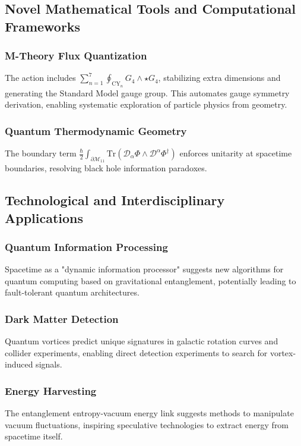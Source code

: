 \documentclass[12pt, a4paper]{article}
\begin{document}
\subsection{Novel Mathematical Tools and Computational Frameworks}
\subsubsection{M-Theory Flux Quantization}
The action includes \( \sum_{n=1}^7 \oint_{\text{CY}_n} G_4 \wedge \star G_4 \), stabilizing extra dimensions and generating the Standard Model gauge group. This automates gauge symmetry derivation, enabling systematic exploration of particle physics from geometry.

\subsubsection{Quantum Thermodynamic Geometry}
The boundary term \( \frac{\hbar}{2} \int_{\partial\mathcal{M}_{11}} \text{Tr}(\mathcal{D}_\alpha \Phi \wedge \mathcal{D}^\alpha \Phi^\dagger) \) enforces unitarity at spacetime boundaries, resolving black hole information paradoxes.

\subsection{Technological and Interdisciplinary Applications}
\subsubsection{Quantum Information Processing}
Spacetime as a "dynamic information processor" suggests new algorithms for quantum computing based on gravitational entanglement, potentially leading to fault-tolerant quantum architectures.

\subsubsection{Dark Matter Detection}
Quantum vortices predict unique signatures in galactic rotation curves and collider experiments, enabling direct detection experiments to search for vortex-induced signals.

\subsubsection{Energy Harvesting}
The entanglement entropy-vacuum energy link suggests methods to manipulate vacuum fluctuations, inspiring speculative technologies to extract energy from spacetime itself.
\end{document}
